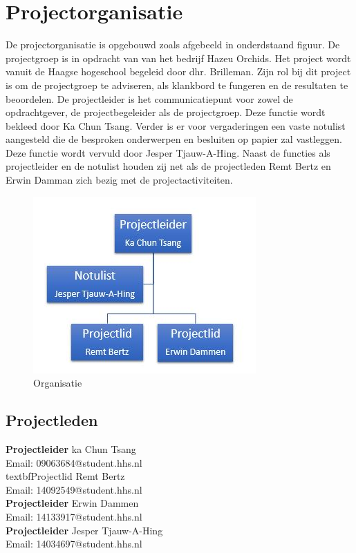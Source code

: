 
\section{Projectorganisatie}

De projectorganisatie is opgebouwd zoals afgebeeld in onderdstaand figuur. De projectgroep is in opdracht van van het bedrijf Hazeu Orchids.
Het project wordt vanuit de Haagse hogeschool begeleid door dhr. Brilleman. Zijn rol bij
dit project is om de projectgroep te adviseren, als klankbord te fungeren en de resultaten
te beoordelen. De projectleider is het communicatiepunt voor zowel de opdrachtgever, de
projectbegeleider als de projectgroep. Deze functie wordt bekleed door Ka Chun Tsang.
Verder is er voor vergaderingen een vaste notulist aangesteld die de besproken onderwerpen
en besluiten op papier zal vastleggen. Deze functie wordt vervuld door Jesper Tjauw-A-Hing.
Naast de functies als projectleider en de notulist houden zij net als de projectleden Remt Bertz en Erwin Damman zich bezig met de projectactiviteiten.

\begin{figure}[h]
	\centering
	\includegraphics[width=\textwidth]{Afbeeldingen/Organisatie.JPG}
	\caption{Organisatie} 
\end{figure}
\newpage

\subsection{Projectleden}

\textbf{Projectleider}
ka Chun Tsang\\
Email: 09063684@student.hhs.nl\\[0.5cm]

textbf{Projectlid}
Remt Bertz\\
Email: 14092549@student.hhs.nl\\[0.5cm]

\textbf{Projectleider}
Erwin Dammen\\
Email: 14133917@student.hhs.nl\\[0.5cm]

\textbf{Projectleider}
Jesper Tjauw-A-Hing\\
Email: 14034697@student.hhs.nl\\[0.5cm]


\newpage

